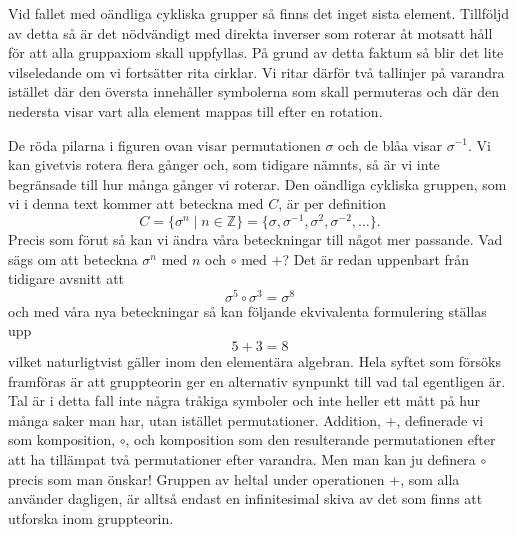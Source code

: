 \documentclass{article}
\theoremstyle{definition}
\begin{document}
Vid fallet med oändliga cykliska grupper så finns det inget sista element. 
Tillföljd av detta så är det nödvändigt 
med direkta inverser som roterar åt motsatt håll för att alla gruppaxiom skall uppfyllas. 
På grund av detta faktum så blir det lite vilseledande om vi fortsätter rita cirklar. 
Vi ritar därför två tallinjer på varandra istället där den översta innehåller symbolerna 
som skall permuteras och där den
nedersta visar vart alla element mappas till 
efter en rotation.

\begin{center}
\end{center}
De röda pilarna i figuren ovan visar permutationen $\sigma$ och de blåa visar $\sigma^{-1}$.
Vi kan givetvis rotera flera gånger och, som tidigare nämnts, så är vi inte begränsade
till hur många gånger vi roterar. 
Den oändliga cykliska gruppen, som vi i denna text kommer att beteckna med $C$, är per definition 
\[C = \{ \sigma^n \; | \; n \in \mathbb{Z} \} = 
\{ \sigma, \sigma^{-1}, \sigma^2, \sigma^{-2}, \ldots \}.\]
Precis som förut så kan vi ändra våra beteckningar till något mer passande. 
Vad sägs om att beteckna $\sigma^n$ med $n$ och $\circ$ med $+$? 
Det är redan uppenbart från tidigare avsnitt att 
\[\sigma^5 \circ \sigma^3 = \sigma^8\]
och med våra nya beteckningar så kan följande ekvivalenta formulering ställas upp
\[5 + 3 = 8\]
vilket naturligtvist gäller inom den elementära algebran. 
Hela syftet som försöks framföras är att gruppteorin ger en alternativ synpunkt till vad 
tal egentligen är. Tal är i detta fall 
inte några tråkiga symboler och inte heller ett mått på hur många 
saker man har, utan istället permutationer. Addition, +, definerade vi som komposition, $\circ$,
och komposition som den resulterande permutationen efter att ha tillämpat två permutationer 
efter varandra. Men man kan ju definera $\circ$ precis som man önskar! 
Gruppen av heltal under operationen +, som alla använder dagligen, är alltså endast 
en infinitesimal skiva av det som finns att utforska inom gruppteorin. 
\end{document}
